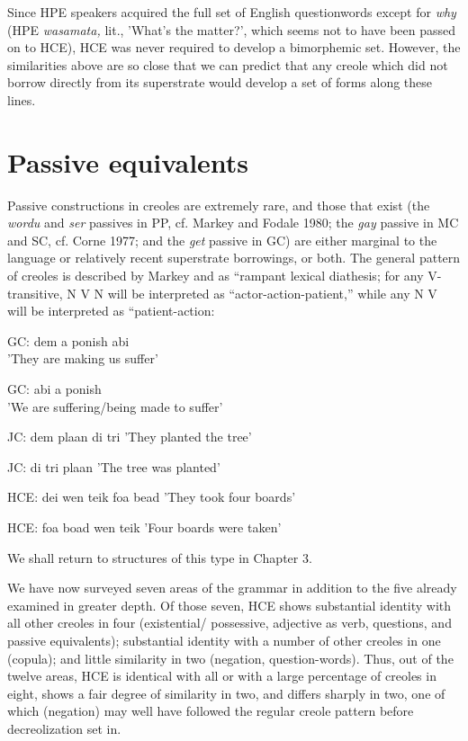 Since HPE speakers acquired the full set of English question\-words except for \textit{why} (HPE \textit{wasamata,} lit., 'What's the matter?', which seems not to have been passed on to HCE), HCE was never required to develop a bimorphemic set. However, the similarities above are so close that we can predict that any creole which did not borrow directly from its superstrate would develop a set of forms along these lines.

\section{Passive equivalents}

Passive constructions in creoles are extremely rare, and those that exist (the \textit{wordu} and \textit{ser} passives in PP, cf. Markey and Fodale 1980; the \textit{gay} passive in MC and SC, cf. Corne 1977; and the \textit{get} passive in
GC) are either marginal to the language or relatively recent super\-strate borrowings, or both. The general pattern of creoles is described by Markey and \citet{Fodale1980} as ``rampant lexical diathesis{\textquotedbl}; for any V-transitive, N V N will be interpreted as ``actor-action-patient,'' while any N V will be interpreted as ``patient-action{\textquotedbl}:

\ea\label{ex:86}
 GC: dem a ponish abi\\
\glt'They are making us suffer'
\z

\ea\label{ex:87}
GC: abi a ponish\\
'We are suffering/being made to suffer'
\z

\ea\label{ex:88}
 JC: dem plaan di tri
\glt 'They planted the tree'
\z



\ea\label{ex:89}
 JC: di tri plaan
\glt 'The tree was planted'
\z



\ea\label{ex:90}
 HCE: dei wen teik foa bead
\glt 'They took four boards'
\z



\ea\label{ex:91}
 HCE: foa boad wen teik
\glt 'Four boards were taken'
\z



We shall return to structures of this type in Chapter 3.

We have now surveyed seven areas of the grammar in addition to the five already examined in greater depth. Of those seven, HCE shows substantial identity with all other creoles in four (existential/ possessive, adjective as verb, questions, and passive equivalents); substantial iden\-tity with a number of other creoles in one (copula); and little simi\-larity in two (negation, question-words). Thus, out of the twelve areas, HCE is identical with all or with a large percentage of creoles in eight, shows a fair degree of similarity in two, and differs sharply in two, one of which (negation) may well have followed the regular creole pattern before decreolization set in.

